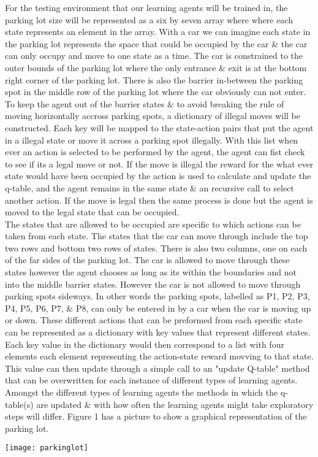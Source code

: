 \documentclass[letterpaper]{article}
\begin{document}
\indent For the testing environment that our learning agents will be trained in, the parking lot size will be represented as a six by seven array where where each state represents an element in the array. With a car we can imagine each state in the parking lot represents the space that could be occupied by the car \& the car can only occupy and move to one state as a time. The car is constrained to the outer bounds of the parking lot where the only entrance \& exit is at the bottom right corner of the parking lot. There is also the barrier in-between the parking spot in the middle row of the parking lot where the car obviously can not enter.  To keep the agent out of the barrier states \& to avoid breaking the rule of moving horizontally accross parking spots, a dictionary of illegal moves will be constructed.  Each key will be mapped to the state-action pairs that put the agent in a illegal state or move it across a parking spot illegally.  With this list when ever an action is selected to be performed by the agent, the agent can fist check to see if its a legal move or not.  If the move is illegal the reward for the what ever state would have been occupied by the action is used to calculate and update the q-table, and the agent remains in the same state \& an recursive call to select another action.  If the move is legal then the same process is done but the agent is moved to the legal state that can be occupied.\\
\indent The states that are allowed to be occupied are specific to which actions can be taken from each state. The states that the car can move through include the top two rows and bottom two rows of states.  There is also two columns, one on each of the far sides of the parking lot. The car is allowed to move through these states however the agent chooses as long as its within the boundaries and not into the middle barrier states. However the car is not allowed to move through parking spots sideways.  In other words the parking spots, labelled as P1, P2, P3, P4, P5, P6, P7, \& P8, can only be entered in by a car when the car is moving up or down.  These different actions that can be preformed from each specific state can be represented as a dictionary with key values that represent different states.  Each key value in the dictionary would then correspond to a list with four elements each element representing the action-state reward movving to that state.  This value can then update through a simple call to an "update Q-table" method that can be overwritten for each instance of different types of learning agents.  Amongst the different types of learning agents the methods in which the q-table(s) are updated \& with how often the learning agents might take exploratory steps will differ.
 Figure 1 has a picture to show a graphical representation of the parking lot.
\begin{center}
\texttt{[image: parkinglot]}
\end{center}
\end{document}

